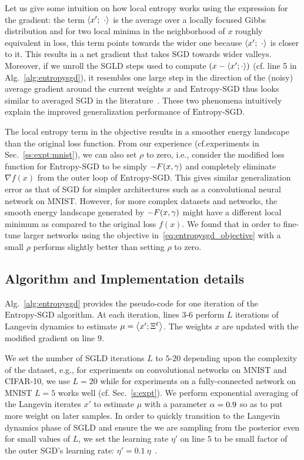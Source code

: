 \documentclass[10pt]{article}
\newcommand{\entropysgd}{\mathrm{Entropy}\textrm{-}\mathrm{SGD}}
\newcommand{\minibatch}[1]{\Xi^{#1}}
\begin{document}
Let us give some intuition on how local entropy works using the expression for the gradient: the term $\left\langle x';\ \cdot\right\rangle$ is the average over a locally focused Gibbs distribution and for two local minima in the neighborhood of $x$ roughly equivalent in loss, this term points towards the wider one because $\left\langle x';\ \cdot\right\rangle$ is closer to it. This results in a net gradient that takes SGD towards wider valleys. Moreover, if we unroll the SGLD steps used to compute $\left(x - \left\langle x'; \cdot\right\rangle\right)$ (cf. line 5 in Alg.~\ref{alg:entropysgd}), it resembles one large step in the direction of the (noisy) average gradient around the current weights $x$ and $\entropysgd$ thus looks similar to averaged SGD in the literature~\citep{polyak1992acceleration,bottou2012stochastic}. These two phenomena intuitively explain the improved generalization performance of $\entropysgd$.

The local entropy term in the objective results in a smoother energy landscape than the original loss function. From our experience (cf.\@ experiments in Sec.~\ref{ss:expt:mnist}), we can also set $\rho$ to zero, i.e., consider the modified loss function for $\entropysgd$ to be simply $-F(x, \gamma)$ and completely eliminate $\nabla f(x)$ from the outer loop of $\entropysgd$. This gives similar generalization error as that of SGD for simpler architectures such as a convolutional neural network on MNIST. However, for more complex datasets and networks, the smooth energy landscape generated by $-F(x, \gamma)$ might have a different local minimum as compared to the original loss $f(x)$. We found that in order to fine-tune larger networks using the objective in~\eqref{eq:entropysgd_objective} with a small $\rho$ performs slightly better than setting $\rho$ to zero.

\subsection{Algorithm and Implementation details}
\label{ss:alg}

Alg.~\ref{alg:entropysgd} provides the pseudo-code for one iteration of the $\entropysgd$ algorithm. At each iteration, lines $3$-$6$ perform $L$ iterations of Langevin dynamics to estimate $\mu = \ag{x'; \minibatch{\ell}}$. The weights $x$ are updated with the modified gradient on line $9$.

We set the number of SGLD iterations $L$ to $5$-$20$ depending upon the complexity of the dataset, e.g., for experiments on convolutional networks on MNIST and CIFAR-10, we use $L = 20$ while for experiments on a fully-connected network on MNIST $L=5$ works well (cf. Sec.~\ref{s:expt}). We perform exponential averaging of the Langevin iterates $x'$ to estimate $\mu$ with a parameter $\alpha = 0.9$ so as to put more weight on later samples. In order to quickly transition to the Langevin dynamics phase of SGLD and ensure the we are sampling from the posterior even for small values of $L$, we set the learning rate $\eta'$ on line $5$ to be small factor of the outer SGD's learning rate: $\eta' = 0.1\ \eta$~\citep{welling2011bayesian}.
\end{document}
